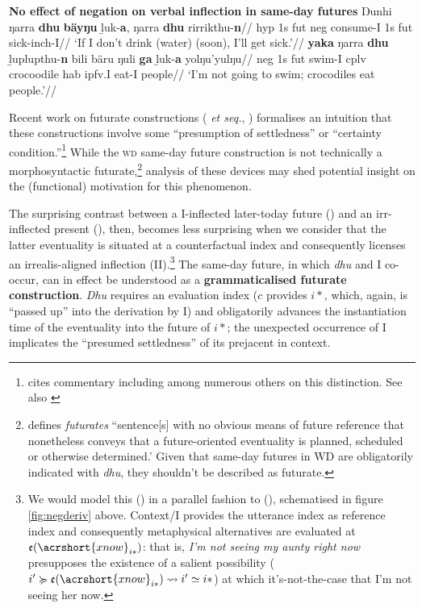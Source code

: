 \pex \textbf{No effect of negation on verbal inflection in same-day futures}
\a\begingl\gla Ŋunhi ŋarra \textbf{dhu} \textbf{bäyŋu} ḻuk-\textbf{a}, ŋarra \textbf{dhu} rirrikthu-\textbf{n}//
\glb \gls{hyp} 1s \gls{fut} \gls{neg} consume-\gls{I} 1s \gls{fut} sick-\gls{inch}-\gls{I}//
\glft`If I don't drink (water) (soon), I'll get sick.'\trailingcitation{[AW~20190409]}//
\endgl
\a\begingl\gla \textbf{yaka} ŋarra \textbf{dhu} ḻuplupthu-\textbf{n} bili bäru ŋuli \textbf{ga} ḻuk-\textbf{a} yolŋu'yulŋu//
\glb \gls{neg} 1s \gls{fut} swim-\gls{I} \gls{cplv} crocoodile \gls{hab} \gls{ipfv}.\gls{I} eat-\gls{I} people//
\glft`I'm not going to swim; crocodiles eat people.'\trailingcitation{[AW~20190428]}//
\endgl\xe

Recent work on futurate constructions (\citealp[see \textit{e.g.},][]{Copley2009,Copley2008a} \textit{et seq.}, \citealp{Kaufmann2002,Kaufmann2005}) formalises an intuition that these constructions involve some ``presumption of settledness'' or ``certainty condition.''\footnote{\citet{Kaufmann2002} cites commentary including \citet{Dowty1979,Comrie1985} among numerous others on this distinction. See also \citet[note 1]{Copley2008a}} While the \textsc{wd} same-day future construction is not technically a morphosyntactic futurate,\footnote{\citet[261]{Copley2008a} defines \textit{futurates} ``sentence[s] with no obvious means of future reference that nonetheless conveys that a future-oriented eventuality is planned, scheduled or otherwise determined.' Given that same-day futures in WD are obligatorily indicated with \textit{dhu}, they shouldn't be described as futurate.} analysis of these devices may shed potential insight on the (functional) motivation for this phenomenon.

The surprising contrast between a \gls{I}-inflected later-today future () and an \gls{irr}-inflected present (), then, becomes less surprising when we consider that the latter eventuality is situated at a counterfactual index and consequently licenses an irrealis-aligned inflection (\gls{II}).\footnote{We would model this () in a parallel fashion to (), schematised in figure \ref{fig:negderiv} above. Context/\gls{I} provides the utterance index as reference index and consequently metaphysical alternatives are evaluated at $ \mathfrak{e}(\acrshort{xnow}_{i*}) $: that is, \textit{I'm not seeing my aunty right now} presupposes the existence of a salient possibility ($ i'\succcurlyeq\mathfrak{e}(\acrshort{xnow}_{i*})\leadsto i'\simeq i* $) at which it's-not-the-case that I'm not seeing her now.} The same-day future, in which \textit{dhu} and \gls{I} co-occur, can in effect be understood as a \textbf{grammaticalised futurate construction}. \textit{Dhu} requires an evaluation index ($ c $ provides $ i* $, which, again, is ``passed up'' into the derivation by \gls{I}) and obligatorily advances the instantiation time of the eventuality into the future of $ i* $; the unexpected occurrence of \gls{I} implicates the ``presumed settledness'' of its prejacent in context.

